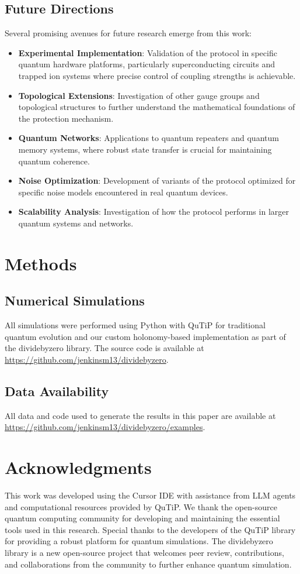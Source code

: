 \documentclass[12pt]{article}
\begin{document}
\subsection{Future Directions}
Several promising avenues for future research emerge from this work:
\begin{itemize}
\item \textbf{Experimental Implementation}: Validation of the protocol in specific quantum hardware platforms, particularly superconducting circuits and trapped ion systems where precise control of coupling strengths is achievable.
\item \textbf{Topological Extensions}: Investigation of other gauge groups and topological structures to further understand the mathematical foundations of the protection mechanism.
\item \textbf{Quantum Networks}: Applications to quantum repeaters and quantum memory systems, where robust state transfer is crucial for maintaining quantum coherence.
\item \textbf{Noise Optimization}: Development of variants of the protocol optimized for specific noise models encountered in real quantum devices.
\item \textbf{Scalability Analysis}: Investigation of how the protocol performs in larger quantum systems and networks.
\end{itemize}

\section{Methods}
\subsection{Numerical Simulations}
All simulations were performed using Python with QuTiP for traditional quantum evolution and our custom holonomy-based implementation as part of the dividebyzero library. The source code is available at \url{https://github.com/jenkinsm13/dividebyzero}.

\subsection{Data Availability}
All data and code used to generate the results in this paper are available at \url{https://github.com/jenkinsm13/dividebyzero/examples}.

\section{Acknowledgments}
This work was developed using the Cursor IDE with assistance from LLM agents and computational resources provided by QuTiP. We thank the open-source quantum computing community for developing and maintaining the essential tools used in this research. Special thanks to the developers of the QuTiP library for providing a robust platform for quantum simulations. The dividebyzero library is a new open-source project that welcomes peer review, contributions, and collaborations from the community to further enhance quantum simulation.
\end{document}
